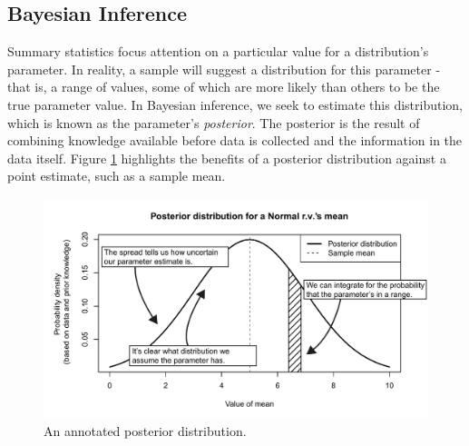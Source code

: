 \documentclass[11pt,a4paper,article]{memoir} %
\begin{document}
\subsection*{Bayesian Inference}
Summary statistics focus attention on a particular value for a distribution's parameter. In reality, a sample will suggest a distribution for this parameter - that is, a range of values, some of which are more likely than others to be the true parameter value. In Bayesian inference, we seek to estimate this distribution, which is known as the parameter's \emph{posterior}. The posterior is the result of combining knowledge available before data is collected and the information in the data itself. Figure \ref{fig:annotated_posterior} highlights the benefits of a posterior distribution against a point estimate, such as a sample mean.
\begin{figure}
\includegraphics[width=\textwidth]{annotated_posterior.pdf}
\caption{An annotated posterior distribution.}
\label{fig:annotated_posterior}
\end{figure}
\end{document}
